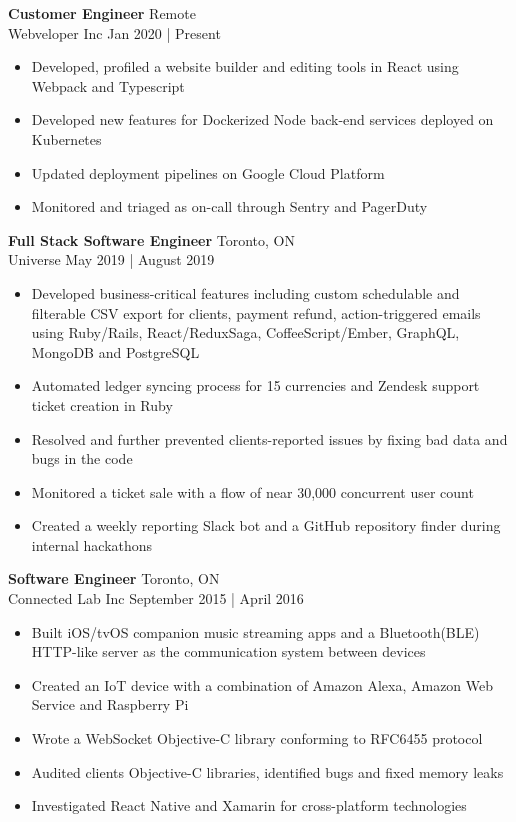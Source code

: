 \documentclass[a4paper]{article}
\begin{document}
\textbf{\normalsize Customer Engineer} \hfill Remote\\
\textcolor{jobGray}{Webveloper Inc} \hfill \textcolor{dateGray}{Jan 2020 | Present}\\
\vspace{-2mm}
\begin{itemize}[leftmargin=1cm ] \itemsep -0.5pt
	\item Developed, profiled a website builder and editing tools in React using Webpack and Typescript
	\item Developed new features for Dockerized Node back-end services deployed on Kubernetes
	\item Updated deployment pipelines on Google Cloud Platform
  \item Monitored and triaged as on-call through Sentry and PagerDuty
\end{itemize}
\textbf{\normalsize Full Stack Software Engineer} \hfill Toronto, ON\\
\textcolor{jobGray}{Universe} \hfill \textcolor{dateGray}{May 2019 | August 2019}\\
\vspace{-2mm}
\begin{itemize}[leftmargin=1cm ] \itemsep -0.5pt
	\item Developed business-critical features including custom schedulable and filterable CSV export for clients, payment refund, action-triggered emails using Ruby/Rails, React/ReduxSaga, CoffeeScript/Ember, GraphQL, MongoDB and PostgreSQL  
	\item Automated ledger syncing process for 15 currencies and Zendesk support ticket creation in Ruby
	\item Resolved and further prevented clients-reported issues by fixing bad data and bugs in the code
	\item Monitored a ticket sale with a flow of near 30,000 concurrent user count
	\item Created a weekly reporting Slack bot and a GitHub repository finder during internal hackathons 
\end{itemize}
\textbf{\normalsize Software Engineer} \hfill Toronto, ON\\ 
\textcolor{jobGray}{Connected Lab Inc} \hfill \textcolor{dateGray}{September 2015 | April 2016}\\
\vspace{-2mm}
\begin{itemize}[leftmargin=1cm ] \itemsep -0.5pt
	\item Built iOS/tvOS companion music streaming apps and a Bluetooth(BLE) HTTP-like server as the communication system between devices
	\item Created an IoT device with a combination of Amazon Alexa, Amazon Web Service and Raspberry Pi
	\item Wrote a WebSocket Objective-C library conforming to RFC6455 protocol
	\item Audited client\textquotesingle{}s Objective-C libraries, identified bugs and fixed memory leaks 
	\item Investigated React Native and Xamarin for cross-platform technologies
\end{itemize}
\end{document}

